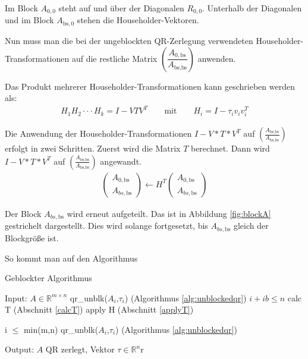 Im Block $A_{0, 0}$ steht auf und über der Diagonalen $R_{0,0}$. Unterhalb der Diagonalen und im Block $A_{\text{bs}, 0}$ stehen die Householder-Vektoren.

Nun muss man die bei der ungeblockten QR-Zerlegung verwendeten Householder-Transformationen auf die restliche Matrix $ \left(\dfrac{A_{0, \text{bs}}}{A_{\text{bs}, \text{bs}}} \right)$ anwenden.

Das Produkt mehrerer Householder-Transformationen kann geschrieben werden als:
\begin{align*}
H_1H_2 \cdot \cdot \cdot H_k = I - VTV^T \qquad \text{mit}\qquad H_i = I - \tau_i v_iv_i^T
\end{align*}  \cite{Joffrain:2006:AHT:1141885.1141886}

Die Anwendung der Householder-Transformationen $I - V*T*V^T$ auf $\left(\frac{A_{\text{bs}, \text{bs}}}{A_{\text{bs}, \text{bs}}} \right)$ erfolgt in zwei Schritten. Zuerst wird  die Matrix $T$ berechnet. Dann wird $I - V*T*V^T$  auf $\left(\frac{A_{\text{bs}, \text{bs}}}{A_{\text{bs}, \text{bs}}} \right)$ angewandt.
\begin{align}
	\left(\begin{array}{l} 
	A_{0, \text{bs}} \\ \hline
	A_{bs, \text{bs}}
	\end{array}\right)
	\leftarrow
	H^T \left(\begin{array}{l} 
	A_{0, \text{bs}} \\ \hline
	A_{bs, \text{bs}}
	\end{array}\right)
\end{align}

Der Block $A_{bs, \text{bs}}$ wird erneut aufgeteilt. Das ist in Abbildung \ref{fig:blockA} gestrichelt dargestellt.
Dies wird solange fortgesetzt, bis $A_{bs, \text{bs}}$ gleich der Blockgröße ist.

So kommt man auf den Algorithmus 

\begin{algorithm}[H]
	\caption{Geblockter Algorithmus}
	\label{alg:blockedqr}
	\begin{algorithmic}[1]
		\State Input: $A \in \mathbb{R}^{m \times n}$
			\State qr\_unblk($A_i$,$\tau_i$) (Algorithmus \ref{alg:unblockedqr})
			\If $i + ib \le n$
				\State calc T (Abschnitt \ref{calcT})
				\State apply H (Abschnitt \ref{applyT})
			\EndIf 
		\EndFor	
		
		\If i $\le$ min(m,n)
			\State qr\_unblk($A_i$,$\tau_i$) (Algorithmus \ref{alg:unblockedqr})
		\EndIf
		 
		\State Output: $A$ QR zerlegt, Vektor $\tau \in \mathbb{R}^n$r
	\end{algorithmic}
\end{algorithm}


